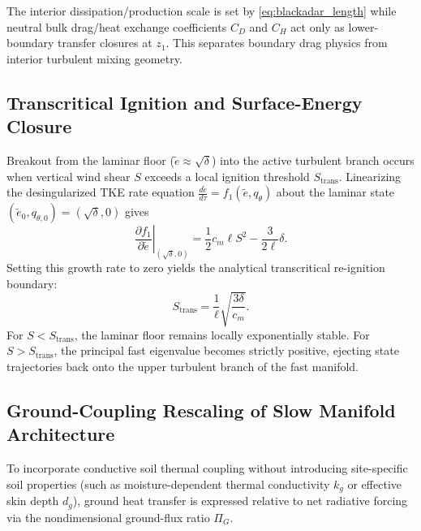 \documentclass[11pt]{article}
\begin{document}
The interior dissipation/production scale is set by \eqref{eq:blackadar_length} while neutral bulk drag/heat exchange coefficients $C_D$ and $C_H$ act only as lower-boundary transfer closures at $z_1$. This separates boundary drag physics from interior turbulent mixing geometry.

\subsection{Transcritical Ignition and Surface-Energy Closure}
\label{subsec:ignition_and_flux}

Breakout from the laminar floor ($\tilde{e} \approx \sqrt{\delta}$) into the active turbulent branch occurs when vertical wind shear $S$ exceeds a local ignition threshold $S_{\text{trans}}$. Linearizing the desingularized TKE rate equation $\frac{d\tilde{e}}{d\tau} = f_1(\tilde{e}, q_\theta)$ about the laminar state $(\tilde{e}_0, q_{\theta,0}) = (\sqrt{\delta}, 0)$ gives
\begin{equation}
\left.\frac{\partial f_1}{\partial \tilde{e}}\right\rvert_{(\sqrt{\delta}, 0)} = \frac{1}{2} c_m \ell S^2 - \frac{3}{2\ell}\delta.
\label{eq:tke_linearization}
\end{equation}
Setting this growth rate to zero yields the analytical transcritical re-ignition boundary:
\begin{equation}
S_{\text{trans}} = \frac{1}{\ell}\sqrt{\frac{3\delta}{c_m}}.
\label{eq:S_trans}
\end{equation}
For $S < S_{\text{trans}}$, the laminar floor remains locally exponentially stable. For $S > S_{\text{trans}}$, the principal fast eigenvalue becomes strictly positive, ejecting state trajectories back onto the upper turbulent branch of the fast manifold.

\subsection{Ground-Coupling Rescaling of Slow Manifold Architecture}
\label{subsec:ground_coupling_rescaling}

To incorporate conductive soil thermal coupling without introducing site-specific soil properties (such as moisture-dependent thermal conductivity $k_g$ or effective skin depth $d_g$), ground heat transfer is expressed relative to net radiative forcing via the nondimensional ground-flux ratio $\Pi_G$.
\end{document}
